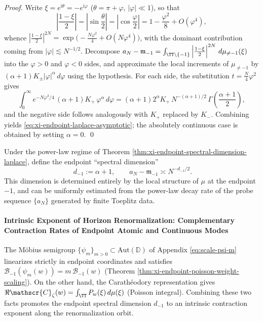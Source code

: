\begin{proof}
Write \(\xi=e^{\mathrm{i}\theta}=-e^{\mathrm{i}\varphi}\) (\(\theta=\pi+\varphi\), \(|\varphi|\ll 1\)), so that
\[
\left|\frac{1-\xi}{2}\right|
=\left|\sin\frac{\theta}{2}\right|
=\left|\cos\frac{\varphi}{2}\right|
=1-\frac{\varphi^2}{8}+O(\varphi^4),
\]
whence \(\left|\frac{1-\xi}{2}\right|^{2N}=\exp\!\bigl(-\frac{N\varphi^2}{4}+O(N\varphi^4)\bigr)\), with the dominant contribution coming from \(|\varphi|\lesssim N^{-1/2}\).
Decompose \(a_N-\mathfrak m_{-1}=\int_{\TT\setminus\{-1\}}\left|\frac{1-\xi}{2}\right|^{2N}\,d\mu_{\neq-1}(\xi)\) into the \(\varphi>0\) and \(\varphi<0\) sides, and approximate the local increments of \(\mu_{\neq-1}\) by \((\alpha+1)K_\pm|\varphi|^{\alpha}\,d\varphi\) using the hypothesis.
For each side, the substitution \(t=\frac{N}{4}\varphi^2\) gives
\[
\int_{0}^{\infty}e^{-N\varphi^2/4}\,(\alpha+1)K_+\,\varphi^{\alpha}\,d\varphi
=(\alpha+1)2^{\alpha}K_+\,N^{-(\alpha+1)/2}\,
\Gamma\!\left(\frac{\alpha+1}{2}\right),
\]
and the negative side follows analogously with \(K_+\) replaced by \(K_-\). Combining yields \eqref{eq:xi-endpoint-laplace-asymptotic}; the absolutely continuous case is obtained by setting \(\alpha=0\). \qed
\end{proof}

\begin{definition}\label{def:xi-endpoint-spectral-dimension}
Under the power-law regime of Theorem \ref{thm:xi-endpoint-spectral-dimension-laplace}, define the endpoint ``spectral dimension''
\[
\boxed{\;
d_{-1}:=\alpha+1,\qquad
a_N-\mathfrak m_{-1}\asymp N^{-d_{-1}/2}.}
\]
This dimension is determined entirely by the local structure of \(\mu\) at the endpoint \(-1\), and can be uniformly estimated from the power-law decay rate of the probe sequence \(\{a_N\}\) generated by finite Toeplitz data.
\end{definition}

\paragraph{Intrinsic Exponent of Horizon Renormalization: Complementary Contraction Rates of Endpoint Atomic and Continuous Modes}
The M\"obius semigroup \(\{\psi_m\}_{m>0}\subset\mathrm{Aut}(\mathbb{D})\) of Appendix \eqref{eq:scale-psi-m} linearizes strictly in endpoint coordinates and satisfies
\(\mathcal{B}_{-1}(\psi_m(w))=m\,\mathcal{B}_{-1}(w)\) (Theorem \ref{thm:xi-endpoint-poisson-weight-scaling}).
On the other hand, the Carath\'eodory representation gives \(\Re \mathscr{C}_{\zeta}(w)=\int_{\TT}P_w(\xi)\,d\mu(\xi)\) (Poisson integral).
Combining these two facts promotes the endpoint spectral dimension \(d_{-1}\) to an intrinsic contraction exponent along the renormalization orbit.

